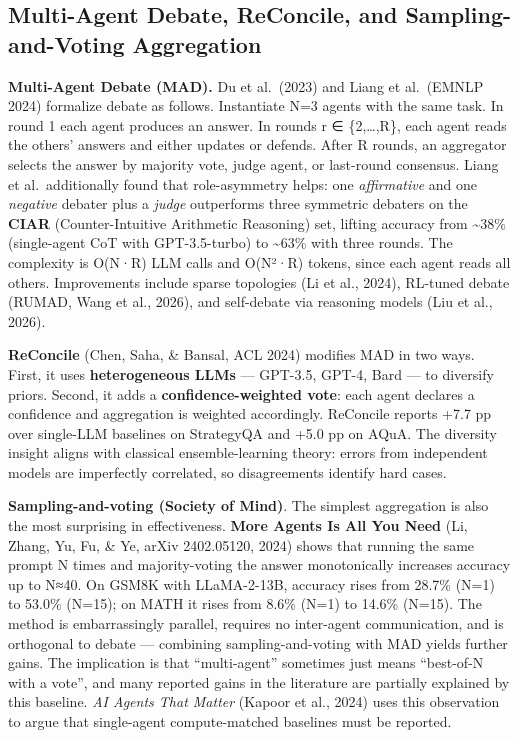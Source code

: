 \subsection{Multi-Agent Debate, ReConcile, and Sampling-and-Voting Aggregation}\label{multi-agent-debate-reconcile-and-sampling-and-voting-aggregation}

\textbf{Multi-Agent Debate (MAD).} Du et al.~(2023) and Liang et al.~(EMNLP 2024) formalize debate as follows. Instantiate N=3 agents with the same task. In round 1 each agent produces an answer. In rounds r ∈ \{2,\ldots,R\}, each agent reads the others' answers and either updates or defends. After R rounds, an aggregator selects the answer by majority vote, judge agent, or last-round consensus. Liang et al.~additionally found that role-asymmetry helps: one \emph{affirmative} and one \emph{negative} debater plus a \emph{judge} outperforms three symmetric debaters on the \textbf{CIAR} (Counter-Intuitive Arithmetic Reasoning) set, lifting accuracy from \textasciitilde38\% (single-agent CoT with GPT-3.5-turbo) to \textasciitilde63\% with three rounds. The complexity is O(N·R) LLM calls and O(N²·R) tokens, since each agent reads all others. Improvements include sparse topologies (Li et al., 2024), RL-tuned debate (RUMAD, Wang et al., 2026), and self-debate via reasoning models (Liu et al., 2026).

\textbf{ReConcile} (Chen, Saha, \& Bansal, ACL 2024) modifies MAD in two ways. First, it uses \textbf{heterogeneous LLMs} --- GPT-3.5, GPT-4, Bard --- to diversify priors. Second, it adds a \textbf{confidence-weighted vote}: each agent declares a confidence and aggregation is weighted accordingly. ReConcile reports +7.7 pp over single-LLM baselines on StrategyQA and +5.0 pp on AQuA. The diversity insight aligns with classical ensemble-learning theory: errors from independent models are imperfectly correlated, so disagreements identify hard cases.

\textbf{Sampling-and-voting (Society of Mind)}. The simplest aggregation is also the most surprising in effectiveness. \textbf{More Agents Is All You Need} (Li, Zhang, Yu, Fu, \& Ye, arXiv 2402.05120, 2024) shows that running the same prompt N times and majority-voting the answer monotonically increases accuracy up to N≈40. On GSM8K with LLaMA-2-13B, accuracy rises from 28.7\% (N=1) to 53.0\% (N=15); on MATH it rises from 8.6\% (N=1) to 14.6\% (N=15). The method is embarrassingly parallel, requires no inter-agent communication, and is orthogonal to debate --- combining sampling-and-voting with MAD yields further gains. The implication is that ``multi-agent'' sometimes just means ``best-of-N with a vote'', and many reported gains in the literature are partially explained by this baseline. \emph{AI Agents That Matter} (Kapoor et al., 2024) uses this observation to argue that single-agent compute-matched baselines must be reported.

